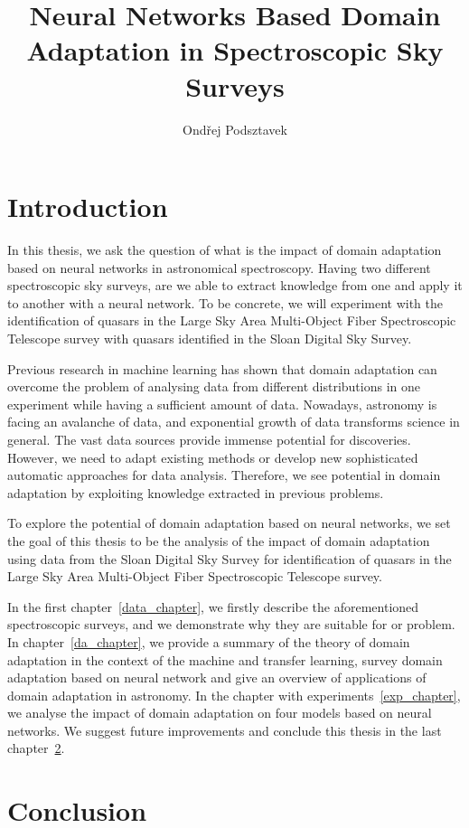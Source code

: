 \documentclass[thesis=M,english]{FITthesis}[2012/10/20]
\title{Neural Networks Based Domain Adaptation in Spectroscopic Sky Surveys}
\author{Ondřej Podsztavek}
\begin{document}
\chapter{Introduction}

In this thesis, we ask the question of what is the impact of domain adaptation based on neural networks in astronomical spectroscopy. Having two different spectroscopic sky surveys, are we able to extract knowledge from one and apply it to another with a neural network. To be concrete, we will experiment with the identification of quasars in the Large Sky Area Multi-Object Fiber Spectroscopic Telescope survey with quasars identified in the Sloan Digital Sky Survey.

Previous research in machine learning has shown that domain adaptation can overcome the problem of analysing data from different distributions in one experiment while having a sufficient amount of data. Nowadays, astronomy is facing an avalanche of data, and exponential growth of data transforms science in general. The vast data sources provide immense potential for discoveries. However, we need to adapt existing methods or develop new sophisticated automatic approaches for data analysis. Therefore, we see potential in domain adaptation by exploiting knowledge extracted in previous problems.

To explore the potential of domain adaptation based on neural networks, we set the goal of this thesis to be the analysis of the impact of domain adaptation using data from the Sloan Digital Sky Survey for identification of quasars in the Large Sky Area Multi-Object Fiber Spectroscopic Telescope survey.

In the first chapter~\ref{data_chapter}, we firstly describe the aforementioned spectroscopic surveys, and we demonstrate why they are suitable for or problem.
In chapter~\ref{da_chapter}, we provide a summary of the theory of domain adaptation in the context of the machine and transfer learning,  survey domain adaptation based on neural network and give an overview of applications of domain adaptation in astronomy. In the chapter with experiments~\ref{exp_chapter}, we analyse the impact of domain adaptation on four models based on neural networks. We suggest future improvements and conclude this thesis in the last chapter~\ref{conclusion}.





\chapter{Conclusion}
\label{conclusion}
\end{document}
